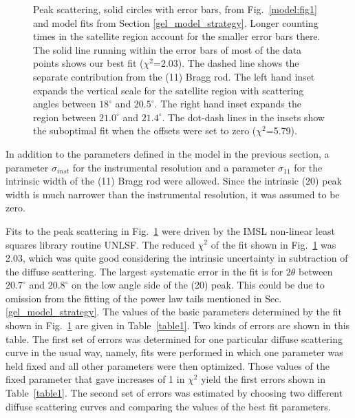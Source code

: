 \begin{figure}[ht]
\centerline {}
\caption{Peak scattering, solid circles with error bars,
from Fig.\ \protect\ref{model:fig1} and
model fits from Section \ref{gel_model_strategy}. Longer counting times in 
the satellite
region account for the smaller error bars there. The solid line running
within the error bars of most
of the data points shows our best fit (${\chi}^{2}$=2.03). The dashed line
shows the separate
contribution from the (11) Bragg rod. The left hand inset expands
the vertical scale for the
satellite region with scattering angles between $18^{\circ}$ and $20.5^{\circ}$.
The right hand inset expands the region between $21.0^{\circ}$
and $21.4^{\circ}$.
The dot-dash lines in the insets show the suboptimal fit when the
offsets were set to zero (${\chi}^{2}$=5.79).
\label{model:fig4}}
\end{figure}

In addition to the parameters defined in the model
in the previous section, a parameter ${\sigma}_{inst}$ for the
instrumental resolution and a parameter
${\sigma}_{11}$ for the intrinsic width of the (11) Bragg rod were allowed.
Since the intrinsic (20) peak width is much narrower than the
instrumental resolution, it was assumed to be zero.

Fits to the peak scattering in Fig.\ \ref{model:fig4} were driven by the IMSL non-linear 
least squares library routine UNLSF.  
The reduced ${\chi}^{2}$ of the fit shown in Fig.\ \ref{model:fig4}
was 2.03, which was quite good considering the intrinsic uncertainty in
subtraction of the diffuse scattering.  The largest systematic
error in the fit is for $2 {\theta}$ between $20.7^{\circ}$ and
$20.8^{\circ}$ on the low angle side of the (20) peak.  This
could be due to omission from the fitting of the power law tails mentioned in 
Sec. \ref{gel_model_strategy}.
The values of the basic parameters determined by the fit 
shown in Fig.\ \ref{model:fig4} are given in Table\ \ref{table1}.  Two kinds of errors are
shown in this table.  The first set of errors was determined
for one particular diffuse scattering curve in the usual way, namely,
fits were performed in which one parameter was held fixed and
all other parameters were then optimized.  Those values of the fixed parameter
that gave increases of 1 in ${\chi}^{2}$ yield the first errors shown in Table\ \ref{table1}.
The second set of errors was estimated by choosing two different diffuse
scattering curves and comparing the values of the best fit parameters.

